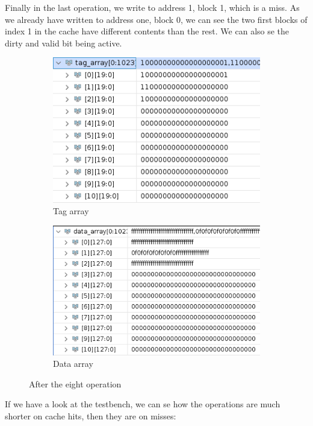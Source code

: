 \documentclass{article}
\begin{document}
Finally in the last operation, we write to address 1, block 1, which is a miss. As we already have written to address one, block 0, we can see the two first blocks of index 1 in the cache have different contents than the rest. We can also se the dirty and valid bit being active. 
\begin{figure}[H]
\centering
\begin{subfigure}{.5\textwidth}
  \centering
  \includegraphics[width=.8\linewidth]{img/tag6.png}
  \caption{Tag array}
\end{subfigure}%
\begin{subfigure}{.5\textwidth}
  \centering
  \includegraphics[width=.9\linewidth]{img/data6.png}
  \caption{Data array}
\end{subfigure}
\caption{After the eight operation}
\end{figure}


If we have a look at the testbench, we can se how the operations are much shorter on cache hits, then they are on misses:
\end{document}
